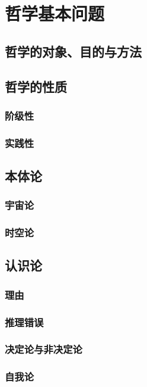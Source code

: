 \documentclass[UTF8]{../RepresentationUniverse}
\begin{document}
\chapter{哲学基本问题}

\section{哲学的对象、目的与方法}


\section{哲学的性质}
    \subsection{阶级性}
    \subsection{实践性}


\section{本体论}
    \subsection{宇宙论}
    \subsection{时空论}


\section{认识论}

    \subsection{理由}
    \subsection{推理错误}

    \subsection{决定论与非决定论}
    \subsection{自我论}
\end{document}
